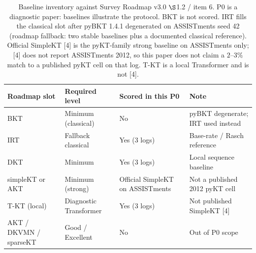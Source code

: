 \begin{table}[htbp]
\caption{Baseline inventory against Survey Roadmap v3.0 $\S$1.2 / item 6. P0 is a diagnostic paper: baselines illustrate the protocol. BKT is not scored. IRT fills the classical slot after pyBKT 1.4.1 degenerated on ASSISTments seed 42 (roadmap fallback: two stable baselines plus a documented classical reference). Official SimpleKT [4] is the pyKT-family strong baseline on ASSISTments only; [4] does not report ASSISTments 2012, so this paper does not claim a $2$--$3\%$ match to a published pyKT cell on that log. T-KT is a local Transformer and is not [4].}
\label{tab:s9_baseline_inventory}
\centering
\small
\begin{tabular}{llll}
\toprule
Roadmap slot & Required level & Scored in this P0 & Note \\
\midrule
BKT & Minimum (classical) & No & pyBKT degenerate; IRT used instead \\
IRT & Fallback classical & Yes (3 logs) & Base-rate / Rasch reference \\
DKT & Minimum & Yes (3 logs) & Local sequence baseline \\
simpleKT or AKT & Minimum (strong) & Official SimpleKT on ASSISTments & Not a published 2012 pyKT cell \\
T-KT (local) & Diagnostic Transformer & Yes (3 logs) & Not published SimpleKT [4] \\
AKT / DKVMN / sparseKT & Good / Excellent & No & Out of P0 scope \\
\bottomrule
\end{tabular}
\end{table}
